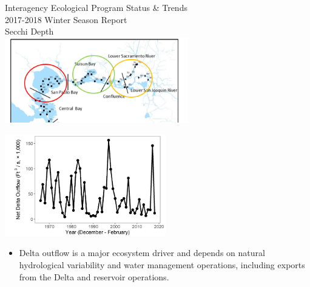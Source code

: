 \documentclass[]{article}\usepackage[]{graphicx}\usepackage[]{color}
\begin{document}
\begin{Row}
  \begin{Cell}{7}
    \vspace{0.2cm}
    \begin{center}
      \doublespacing
      {\Large Interagency Ecological Program Status \& Trends } \\
      \vspace{0.2cm}
      {\Large 2017-2018 Winter Season Report} \\
      \vspace{0.5cm}
      {\Huge Secchi Depth} \\
      \vspace{0.75cm}
      \includegraphics[width=8cm,align=m]{figures/region_map.png}
    \end{center}
  \end{Cell}
  \begin{Cell}{6}
    \vspace{0.2cm}
    \begin{center}
      \includegraphics[width=7cm,trim=0 0 0 0,clip,align=m]{figures/outflow_tmp.png}
      \begin{itemize}[leftmargin=*]
        \item Delta outflow is a major ecosystem driver and depends on natural 
        hydrological variability and water management operations, including exports 
        from the Delta and reservoir operations. 
      \end{itemize}
    \end{center}
  \end{Cell}
\end{Row}
\end{document}
